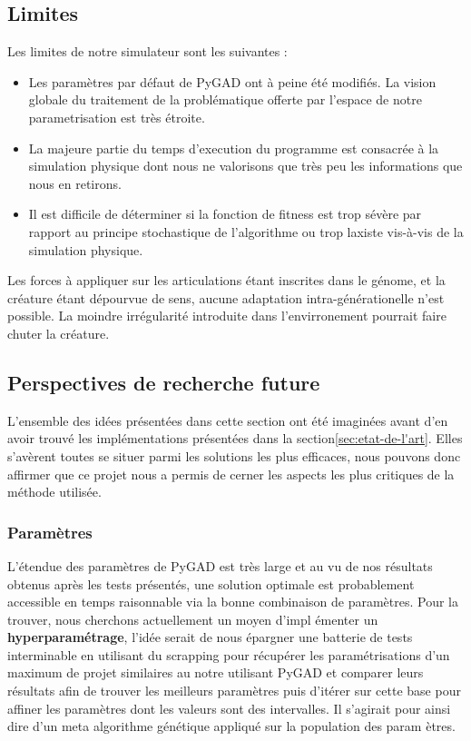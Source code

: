 \documentclass[journal, a4paper]{IEEEtran}
\begin{document}
\subsection{Limites}\label{subsec:limites}
	Les limites de notre simulateur sont les suivantes :
	\begin{itemize}
		\item Les paramètres par défaut de PyGAD ont à peine été
		modifiés. La vision globale du traitement de la problématique
		offerte par l'espace de notre parametrisation est très étroite.
		\item La majeure partie du temps d'execution du programme est
		consacrée à la simulation physique dont nous ne valorisons que
		très peu les informations que nous en retirons.
		\item Il est difficile de déterminer si la fonction de
		fitness
		est trop sévère par rapport au principe stochastique de l'algorithme
		ou trop laxiste vis-à-vis de la simulation physique.
	\end{itemize}
	Les forces à appliquer sur les articulations étant inscrites dans
	le génome, et la créature étant dépourvue de sens, aucune adaptation
	intra-générationelle n'est possible.
	La moindre irrégularité introduite dans l'envirronement
	pourrait faire chuter la créature.
\subsection{Perspectives de recherche future}\label{subsec:perspectives-de-recherche-future}
	L'ensemble des idées présentées dans cette section ont été imaginées
	avant d'en avoir trouvé les implémentations présentées dans la
	section\ref{sec:etat-de-l'art}. Elles s'avèrent toutes se situer
	parmi les solutions les plus efficaces, nous pouvons donc affirmer
	que ce projet nous a permis de cerner les aspects les plus critiques
	de la méthode utilisée.

\subsubsection{Paramètres}
	L'étendue des paramètres de PyGAD est très large et au vu de nos
	résultats obtenus après les tests présentés,
	une solution
	optimale est probablement accessible en temps raisonnable via
	la bonne combinaison de paramètres.
	Pour la trouver, nous cherchons actuellement un moyen d'impl
	émenter un \textbf{hyperparamétrage}, l'idée serait	de nous
	épargner
	une batterie de
	tests interminable en
	utilisant du scrapping pour récupérer les paramétrisations d'un
	maximum de
	projet similaires au notre utilisant PyGAD et comparer leurs
	résultats afin de
	trouver
	les
	meilleurs paramètres puis d'itérer sur cette base pour affiner
	les paramètres dont les valeurs sont des intervalles. Il s'agirait
	pour ainsi dire d'un meta algorithme génétique appliqué sur
	la population des param
	ètres.
\end{document}
